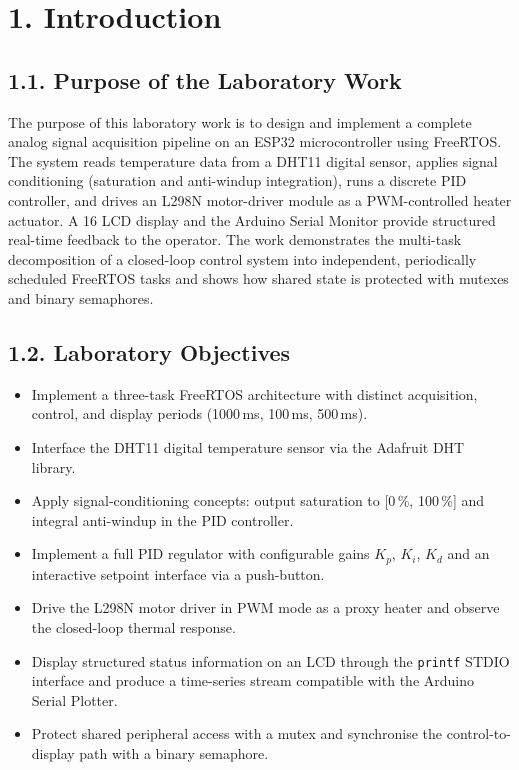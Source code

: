 \documentclass[12pt]{article}
\begin{document}
\setcounter{page}{1}
\pagestyle{fancy}
\fancyhf{}
\rhead{\thepage}

\section*{1. Introduction}

\subsection*{1.1. Purpose of the Laboratory Work}

The purpose of this laboratory work is to design and implement a complete analog signal acquisition
pipeline on an ESP32 microcontroller using FreeRTOS. The system reads temperature data from a DHT11
digital sensor, applies signal conditioning (saturation and anti-windup integration), runs a discrete
PID controller, and drives an L298N motor-driver module as a PWM-controlled heater actuator. A 16
LCD display and the Arduino Serial Monitor provide structured real-time feedback to the operator.
The work demonstrates the multi-task decomposition of a closed-loop control system into independent,
periodically scheduled FreeRTOS tasks and shows how shared state is protected with mutexes and binary
semaphores.

\subsection*{1.2. Laboratory Objectives}

\begin{itemize}
    \item Implement a three-task FreeRTOS architecture with distinct acquisition, control, and display
          periods (1000\,ms, 100\,ms, 500\,ms).
    \item Interface the DHT11 digital temperature sensor via the Adafruit DHT library.
    \item Apply signal-conditioning concepts: output saturation to [0\,\%, 100\,\%] and integral
          anti-windup in the PID controller.
    \item Implement a full PID regulator with configurable gains $K_p$, $K_i$, $K_d$ and an
          interactive setpoint interface via a push-button.
    \item Drive the L298N motor driver in PWM mode as a proxy heater and observe the closed-loop
          thermal response.
    \item Display structured status information on an LCD through the \texttt{printf} STDIO interface
          and produce a time-series stream compatible with the Arduino Serial Plotter.
    \item Protect shared peripheral access with a mutex and synchronise the control-to-display path
          with a binary semaphore.
\end{itemize}
\end{document}
